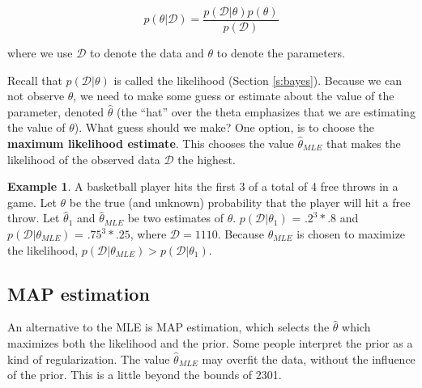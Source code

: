 \documentclass[]{article}
\theoremstyle{definition}
\newtheorem{exmp}{Example}[section]
\begin{document}
\begin{equation}
p(\theta \vert \mathcal{D}) = \frac{p(\mathcal{D} \vert \theta) p(\theta)}{p(\mathcal{D})}
\end{equation}

\noindent where we use $\mathcal{D}$ to denote the data and $\theta$ to denote the parameters. 

Recall that $p(\mathcal{D} \vert \theta)$ is called the likelihood (Section \ref{s:bayes}). Because we can not observe $\theta$, we need to make some guess or estimate about the value of the parameter, denoted  $\hat{\theta}$ (the ``hat'' over the theta emphasizes that we are estimating the value of $\theta$). What guess should we make? One option, 
is to choose the \textbf{maximum likelihood estimate}. This chooses the value $\hat{\theta}_{MLE}$ that makes the likelihood of the observed data $\mathcal{D}$ the highest.
\begin{exmp}
A basketball player hits the first 3 of a total of 4 free throws in a game. Let $\theta$ be the true (and unknown) probability that the player will hit a free throw. Let $\hat{\theta}_1$ and $\hat{\theta}_{MLE}$ be two estimates of $\theta$. $p(\mathcal{D} \vert \theta_1)$ = $.2^3*.8$ and $p(\mathcal{D} \vert \theta_{MLE})$ = $.75^3*.25$, where $\mathcal{D}=111
0$. Because $\theta_{MLE}$ is chosen to maximize the likelihood, $p(\mathcal{D} \vert \theta_{MLE}) > p(\mathcal{D} \vert \theta_1)$.
\end{exmp}



\subsection{MAP estimation}
An alternative to the MLE is MAP estimation, which selects the $\hat{\theta}$ which maximizes both the likelihood and the prior. Some people interpret the prior as a kind of regularization. The value $\hat{\theta}_{MLE}$ may overfit the data, without the influence of the prior. This is a little beyond the bounds of 2301.
\end{document}
